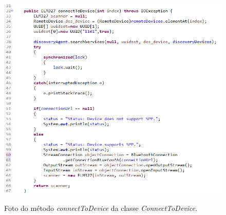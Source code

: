 \begin{figure}[!ht]
\centering
\caption{Foto do método \textit{connectToDevice} da classe \textit{ConnectToDevice}.} 
{\includegraphics[scale=.70]{imagens/pacoteScanner-ConnectToDevice_connectToDevice.png}}\\
 \label{Fig:connect_connect_to_device}
\end{figure}